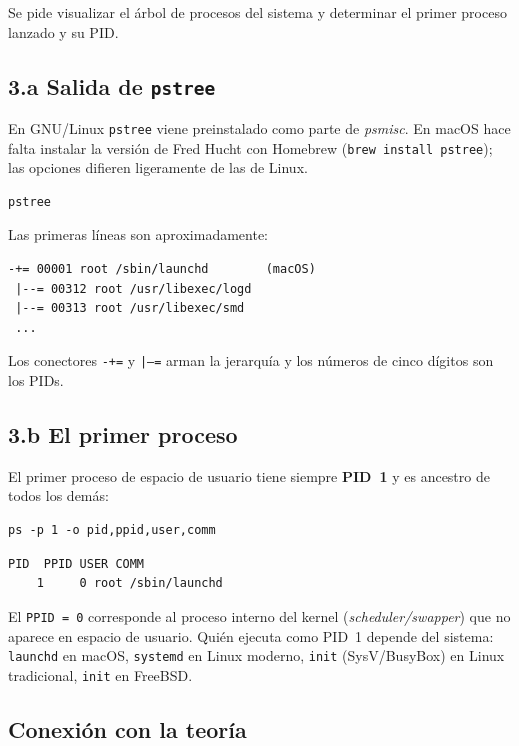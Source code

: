 \documentclass[11pt,a4paper]{article}
\begin{document}
Se pide visualizar el árbol de procesos del sistema y determinar el
primer proceso lanzado y su PID.

\subsection*{3.a Salida de \texttt{pstree}}

En GNU/Linux \texttt{pstree} viene preinstalado como parte de
\emph{psmisc}. En macOS hace falta instalar la versión de Fred Hucht
con Homebrew (\texttt{brew install pstree}); las opciones difieren
ligeramente de las de Linux.

\begin{lstlisting}
pstree
\end{lstlisting}

Las primeras líneas son aproximadamente:

\begin{lstlisting}[style=textstyle]
-+= 00001 root /sbin/launchd        (macOS)
 |--= 00312 root /usr/libexec/logd
 |--= 00313 root /usr/libexec/smd
 ...
\end{lstlisting}

Los conectores \texttt{-+=} y \texttt{|--=} arman la jerarquía y los
números de cinco dígitos son los PIDs.

\subsection*{3.b El primer proceso}

El primer proceso de espacio de usuario tiene siempre \textbf{PID~1} y
es ancestro de todos los demás:

\begin{lstlisting}
ps -p 1 -o pid,ppid,user,comm
\end{lstlisting}

\begin{lstlisting}[style=textstyle]
  PID  PPID USER COMM
    1     0 root /sbin/launchd
\end{lstlisting}

El \texttt{PPID = 0} corresponde al proceso interno del kernel
(\emph{scheduler/swapper}) que no aparece en espacio de usuario. Quién
ejecuta como PID~1 depende del sistema: \texttt{launchd} en macOS,
\texttt{systemd} en Linux moderno, \texttt{init} (SysV/BusyBox) en
Linux tradicional, \texttt{init} en FreeBSD.

\subsection*{Conexión con la teoría}
\end{document}
